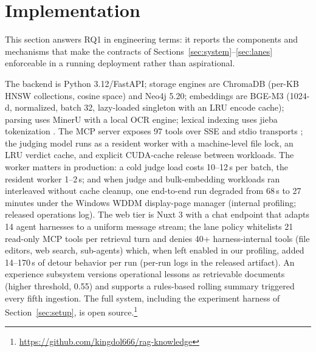 \section{Implementation}
\label{sec:impl}

This section answers RQ1 in engineering terms: it reports the components and
mechanisms that make the contracts of
Sections~\ref{sec:system}--\ref{sec:lanes} enforceable in a running
deployment rather than aspirational.

The backend is Python 3.12/FastAPI; storage engines are ChromaDB (per-KB
HNSW \cite{hnsw} collections, cosine space) and Neo4j 5.20; embeddings are BGE-M3
\cite{bge-m3} (1024-d, normalized, batch 32, lazy-loaded singleton with an
LRU encode cache); parsing uses MinerU \cite{mineru} with a local OCR
engine; lexical indexing uses jieba tokenization \cite{jieba}. The MCP
server exposes 97 tools over SSE and stdio transports \cite{mcp}; the
judging model runs as a resident worker with a machine-level file lock, an
LRU verdict cache, and explicit CUDA-cache release between workloads. The
worker matters in production: a cold judge load costs 10--12\,s per batch,
the resident worker 1--2\,s; and when judge and bulk-embedding workloads
ran interleaved without cache cleanup, one end-to-end run degraded from 68\,s
to 27 minutes under the Windows WDDM display-page manager (internal
profiling; released operations log). The
web tier is Nuxt 3 with a chat endpoint that adapts 14 agent harnesses to a
uniform message stream; the lane policy whitelists 21 read-only MCP tools
per retrieval turn and denies 40+ harness-internal tools (file editors,
web search, sub-agents) which, when left enabled in our profiling, added
14--170\,s of detour behavior per run (per-run logs in the released
artifact). An experience subsystem versions operational
lessons as retrievable documents (higher threshold, 0.55) and supports a
rules-based rolling summary triggered every fifth ingestion. The full
system, including the experiment harness of Section~\ref{sec:setup}, is
open source.\footnote{\url{https://github.com/kingdol666/rag-knowledge}}

